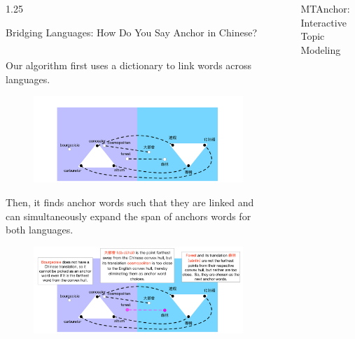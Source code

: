\documentclass[final, 20pt]{beamer}
\newlength{\sepwidth}
\newlength{\colwidth}
\newcommand{\separatorcolumn}{\begin{column}{\sepwidth}\end{column}}
\begin{document}
\begin{frame}[t]
\begin{columns}[t]
\begin{column}{1.25\colwidth}
\begin{block}{Bridging Languages: How Do You Say Anchor in Chinese?}
\begin{columns}[t, totalwidth=\linewidth]
\begin{column}{0.67\textwidth}
\vspace{5cm}

Our algorithm first uses a dictionary to link words across languages.

\begin{figure}
	\centering
	\includegraphics[width=\linewidth]{multi_anchors2}
\end{figure}

\vspace{5cm}

Then, it finds anchor words such that they are linked and can simultaneously expand the span of anchors words for both languages.

\begin{figure}
	\centering
	\includegraphics[width=\linewidth]{multi_anchors6}
\end{figure}

\end{column}
\end{columns}

\end{block}


\end{column}

\separatorcolumn


\begin{column}{\colwidth}
	
	\begin{block}{MTAnchor: Interactive Topic Modeling}
		

\end{block}
\end{column}
\end{columns}
\end{frame}
\end{document}
